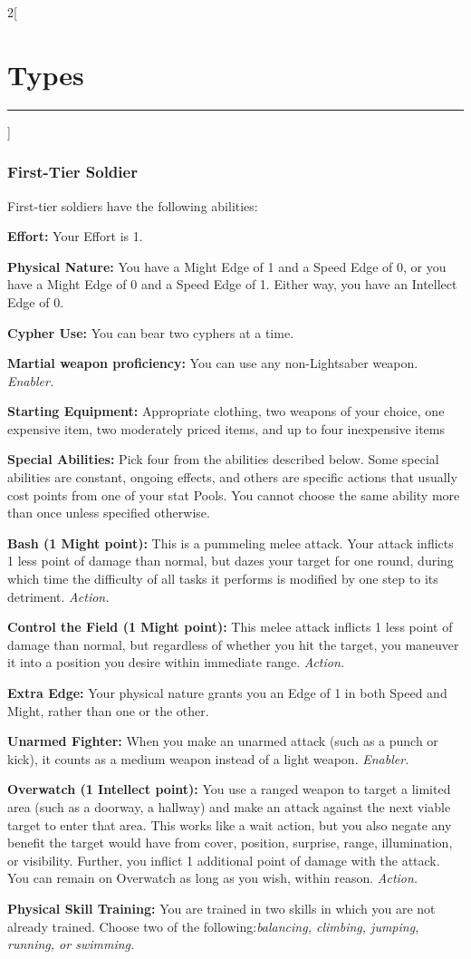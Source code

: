 \documentclass[a4paper,10pt,final]{book}
\newcommand{\HRule}{\rule{\linewidth}{0.5mm}} %
\newcommand{\newSection}[1]{\section*{#1} \addcontentsline{toc}{section}{#1} \label{sec:#1} \HRule}
\newcommand{\itemLine}[2]{\textbf{#1:} {#2}\par}
\newcommand{\itemAbility}[2]{\textcolor{25gray}{\textbullet\textbf{ #1:}} {#2}\par}
\newcommand{\enabler}{\textit{ Enabler.}}
\newcommand{\action}{\textit{ Action.}}
\newenvironment{docsection}[1]
{
  \begin{multicols*}{2}[\newSection{#1}]
}
{
  \end{multicols*}
  \newpage
}
\begin{document}
\begin{docsection}{Types}
\subsubsection*{First-Tier Soldier}
\label{subsub:soldierFirstTier}
First-tier soldiers have the following abilities: \par
\itemLine{Effort} {Your Effort is 1.} 
\itemLine{Physical Nature} {You have a Might Edge
of 1 and a Speed Edge of 0, or you have a
Might Edge of 0 and a Speed Edge of 1.
Either way, you have an Intellect Edge of 0.}
\itemLine{Cypher Use} {You can bear two cyphers at a time.}
\itemLine{Martial weapon proficiency} {You can use any non-Lightsaber weapon.\enabler}
\itemLine{Starting Equipment} {Appropriate clothing, two weapons of your choice, one expensive item, two moderately priced items, and up to four inexpensive items}
\itemLine{Special Abilities} {Pick four from the abilities described below. Some
special abilities are constant, ongoing effects, and
others are specific actions that usually cost points
from one of your stat Pools. You cannot choose the same ability more than once unless specified otherwise.}
\itemAbility{Bash (1 Might point)} {This is a pummeling
melee attack. Your attack inflicts 1 less point
of damage than normal, but dazes your
target for one round, during which time the
difficulty of all tasks it performs is modified
by one step to its detriment.\action}
\itemAbility{Control the Field (1 Might point)} {This
melee attack inflicts 1 less point of damage
than normal, but regardless of whether
you hit the target, you maneuver it into a
position you desire within immediate range.\action}
\itemAbility{Extra Edge} {Your physical nature grants
you an Edge of 1 in both Speed and Might,
rather than one or the other.}
\itemAbility{Unarmed Fighter} {When you make
an unarmed attack (such as a punch or
kick), it counts as a medium weapon
instead of a light weapon.\enabler}
\itemAbility{Overwatch (1 Intellect point)} {You use
a ranged weapon to target a limited area
(such as a doorway, a hallway) and make an attack
against the next viable target to enter that
area. This works like a wait action, but you
also negate any benefit the target would
have from cover, position, surprise, range,
illumination, or visibility. Further, you inflict
1 additional point of damage with the attack.
You can remain on Overwatch as long as you
wish, within reason.\action}
\itemAbility{Physical Skill Training}{You are trained in two
skills in which you are not already trained.
Choose two of the following:\textit{balancing,
climbing, jumping, running, or swimming.}
}
\end{docsection}
\end{document}
